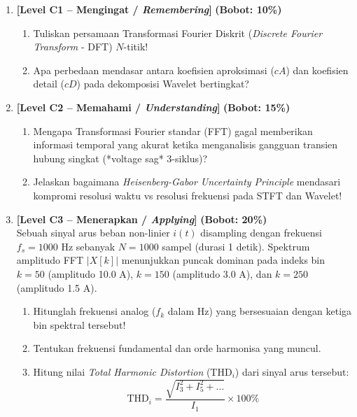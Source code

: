 \documentclass[11pt,a4paper]{article}
\begin{document}
\begin{enumerate}[leftmargin=1.5em, label=\textbf{Soal \arabic*.}]

    \item \textbf{[Level C1 -- Mengingat / \textit{Remembering}]} \hfill \textbf{(Bobot: 10\%)}
    \begin{enumerate}[label=\alph*.]
        \item Tuliskan persamaan Transformasi Fourier Diskrit (\textit{Discrete Fourier Transform} - DFT) $N$-titik!
        \item Apa perbedaan mendasar antara koefisien aproksimasi ($cA$) dan koefisien detail ($cD$) pada dekomposisi Wavelet bertingkat?
    \end{enumerate}

    \vspace{0.3cm}

    \item \textbf{[Level C2 -- Memahami / \textit{Understanding}]} \hfill \textbf{(Bobot: 15\%)}
    \begin{enumerate}[label=\alph*.]
        \item Mengapa Transformasi Fourier standar (FFT) gagal memberikan informasi temporal yang akurat ketika menganalisis gangguan transien hubung singkat (*voltage sag* 3-siklus)?
        \item Jelaskan bagaimana \textit{Heisenberg-Gabor Uncertainty Principle} mendasari kompromi resolusi waktu vs resolusi frekuensi pada STFT dan Wavelet!
    \end{enumerate}

    \vspace{0.3cm}

    \item \textbf{[Level C3 -- Menerapkan / \textit{Applying}]} \hfill \textbf{(Bobot: 20\%)} \\
    Sebuah sinyal arus beban non-linier $i(t)$ disampling dengan frekuensi $f_s = 1000$ Hz sebanyak $N = 1000$ sampel (durasi 1 detik). Spektrum amplitudo FFT $|X[k]|$ menunjukkan puncak dominan pada indeks bin $k = 50$ (amplitudo 10.0 A), $k = 150$ (amplitudo 3.0 A), dan $k = 250$ (amplitudo 1.5 A).
    \begin{enumerate}[label=\alph*.]
        \item Hitunglah frekuensi analog ($f_k$ dalam Hz) yang bersesuaian dengan ketiga bin spektral tersebut!
        \item Tentukan frekuensi fundamental dan orde harmonisa yang muncul.
        \item Hitung nilai \textit{Total Harmonic Distortion} (THD$_i$) dari sinyal arus tersebut:
        \begin{equation*}
            \text{THD}_i = \frac{\sqrt{I_3^2 + I_5^2 + \dots}}{I_1} \times 100\%
        \end{equation*}
    \end{enumerate}


\end{enumerate}
\end{document}
